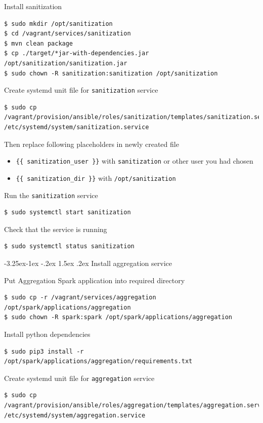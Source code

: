 \documentclass[a4paper]{article} %
\makeatletter
\renewcommand{\normalsize}{\fontsize{12}{15}\selectfont\color{textcolor}}
\renewcommand\subsubsection{\@startsection{subsubsection}{3}{\z@}%
                   {-3.25ex\@plus -1ex \@minus -.2ex}%
                   {1.5ex \@plus .2ex}%
                   {\normalfont\normalsize\sffamily\bfseries\color{projectcolor}}}
\makeatother
\begin{document}
Install sanitization
\begin{lstlisting}
$ sudo mkdir /opt/sanitization
$ cd /vagrant/services/sanitization
$ mvn clean package
$ cp ./target/*jar-with-dependencies.jar /opt/sanitization/sanitization.jar
$ sudo chown -R sanitization:sanitization /opt/sanitization
\end{lstlisting}

Create systemd unit file for \texttt{sanitization} service
\begin{lstlisting}
$ sudo cp /vagrant/provision/ansible/roles/sanitization/templates/sanitization.service.j2 /etc/systemd/system/sanitization.service
\end{lstlisting}

Then replace following placeholders in newly created file
\begin{itemize}
\item \texttt{\{\{ sanitization\_user \}\}} with \texttt{sanitization} or other user you had chosen
\item \texttt{\{\{ sanitization\_dir \}\}} with \texttt{/opt/sanitization}
\end{itemize}

Run the \texttt{sanitization} service
\begin{lstlisting}
$ sudo systemctl start sanitization
\end{lstlisting}

Check that the service is running
\begin{lstlisting}
$ sudo systemctl status sanitization
\end{lstlisting}


\subsubsection{Install aggregation service}

Put Aggregation Spark application into required directory

\begin{lstlisting}
$ sudo cp -r /vagrant/services/aggregation /opt/spark/applications/aggregation
$ sudo chown -R spark:spark /opt/spark/applications/aggregation
\end{lstlisting}

Install python dependencies
\begin{lstlisting}
$ sudo pip3 install -r /opt/spark/applications/aggregation/requirements.txt
\end{lstlisting}

Create systemd unit file for \texttt{aggregation} service
\begin{lstlisting}
$ sudo cp /vagrant/provision/ansible/roles/aggregation/templates/aggregation.service.j2 /etc/systemd/system/aggregation.service
\end{lstlisting}
\end{document}
